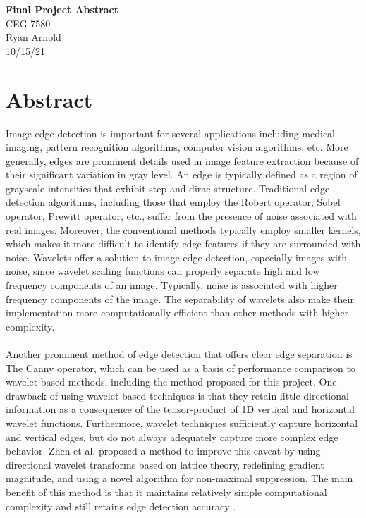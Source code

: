 \documentclass[./abstract_proposal.tex]{subfiles}
\begin{document}


\begin{titlepage}

\noindent
\centering \Huge \textbf{Final Project Abstract} \\
CEG 7580\\
Ryan Arnold \\
10/15/21
\vspace{24pt}

\end{titlepage}

\clearpage
\section*{Abstract}

\noindent Image edge detection is important for several applications including medical imaging, pattern recognition algorithms, computer vision algorithms, etc.  More generally, edges are prominent details used in image feature extraction because of their significant variation in gray level.  An edge is typically defined as a region of grayscale intensities that exhibit step and dirac structure.  Traditional edge detection algorithms, including those that employ the Robert operator, Sobel operator, Prewitt operator, etc., suffer from the presence of noise associated with real images.  Moreover, the conventional methods typically employ smaller kernels, which makes it more difficult to identify edge features if they are surrounded with noise. Wavelets offer a solution to image edge detection, especially images with noise, since wavelet scaling functions can properly separate high and low frequency components of an image.  Typically, noise is associated with higher frequency components of the image.  The separability of wavelets also make their implementation more computationally efficient than other methods with higher complexity. 
\\ \\
\noindent Another prominent method of edge detection that offers clear edge separation is The Canny operator, which can be used as a basis of performance comparison to wavelet based methods, including the method proposed for this project. One drawback of using wavelet based techniques is that they retain little directional information as a consequence of the tensor-product of 1D vertical and horizontal wavelet functions.  Furthermore, wavelet techniques sufficiently capture horizontal and vertical edges, but do not always adequately capture more complex edge behavior.  Zhen et al. proposed a method to improve this caveat by using directional wavelet transforms based on lattice theory, redefining gradient magnitude, and using a novel algorithm for non-maximal suppression.  The main benefit of this method is that it maintains relatively simple computational complexity and still retains edge detection accuracy \cite{redef_gradient}. 
\end{document}
